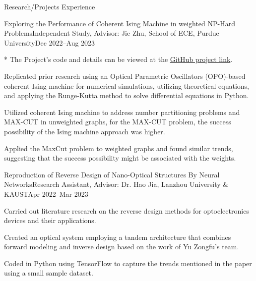 \documentclass[]{kyvernitis-resume}
\begin{document}
\begin{section}{\Large Research/Projects Experience}
    
    
    \begin{subsection}{Exploring the Performance of Coherent Ising Machine in weighted NP-Hard Problems}{Independent Study, Advisor: Jie Zhu, School of ECE, Purdue University}{Dec 2022--Aug 2023}{}
    \item[*] The Project's code and details can be viewed at the  \href{https://github.com/Wang-Zhiping/Exploring-the-Performance-of-Coherent-Ising-Machine-in-weighted-NP-Hard-Problems}{GitHub project link}.
    
        \item Replicated prior research using an Optical Parametric Oscillators (OPO)-based coherent Ising machine for numerical simulations, utilizing theoretical equations, and applying the Runge-Kutta method to solve differential equations in Python.
        \item Utilized coherent Ising machine to address number partitioning problems and MAX-CUT in unweighted graphs, for the MAX-CUT problem, the success possibility of the Ising machine approach was higher.
        \item Applied the MaxCut problem to weighted graphs and found similar trends, suggesting that the success possibility might be associated with the weights.
    \end{subsection}

    
    \begin{subsection}{Reproduction of Reverse Design of Nano-Optical Structures By Neural Networks}{Research Assistant, Advisor: Dr. Hao Jia, Lanzhou University \& KAUST}{Apr 2022--Mar 2023}{}
        \item Carried out literature research on the reverse design methods for optoelectronics devices and their applications.
        \item Created an optical system employing a tandem architecture that combines forward modeling and inverse design based on the work of Yu Zongfu’s team.
        \item Coded in Python using TensorFlow to capture the trends mentioned in the paper using a small sample dataset.
    \end{subsection}
    

\end{section}
\end{document}
